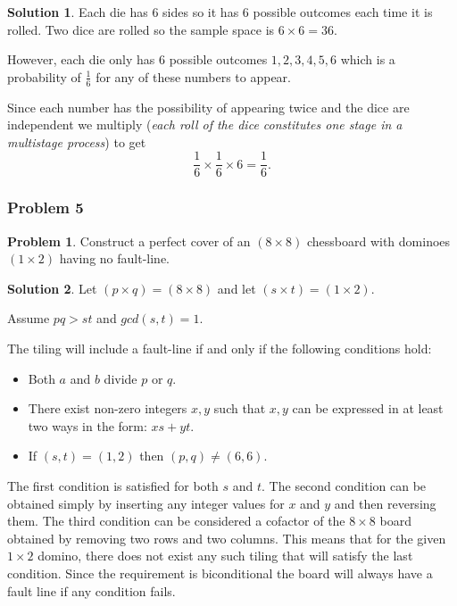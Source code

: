 \documentclass[10pt,a4paper,titlepage,twoside,draft]{article}
\theoremstyle{plain}
\theoremstyle{definition}
\newtheorem*{prob}{Problem}
\newtheorem*{sol}{Solution}
\theoremstyle{remark}
\begin{document}
\medskip

\begin{sol}
    Each die has 6 sides so it has 6 possible outcomes each time it is rolled. Two dice are rolled so the sample space is $6 \times 6 = 36$.

However, each die only has 6 possible outcomes $1, 2, 3, 4, 5, 6$ which is a probability of $\frac{1}{6}$ for any of these numbers to appear. 

Since each number has the possibility of appearing twice and the dice are independent we multiply (\textit{each roll of the dice constitutes one stage in a multistage process}) to get \[ \frac{1}{6} \times \frac{1}{6} \times 6 = \frac{1}{6}.\]
\end{sol} 

\subsubsection{Problem 5} 

\begin{prob}
    Construct a perfect cover of an $(8 \times 8)$ chessboard with dominoes $(1 \times 2)$ having no fault-line.
\end{prob}

\medskip

\begin{sol}
    Let $(p \times q) = (8 \times 8)$ and let $(s \times t) = (1 \times 2)$.

Assume $pq > st$ and $gcd(s,t)=1$.  

The tiling will include a fault-line if and only if the following conditions hold: 
\begin{itemize}
    \item Both $a$ and $b$ divide $p$ or $q$. 
    \item There exist non-zero integers $x,y$ such that $x,y$ can be expressed in at least two ways in the form: $xs+yt$. 
    \item If $(s,t) = (1,2)$ then $(p,q) \neq (6,6)$.
\end{itemize}


The first condition is satisfied for both $s$ and $t$.
The second condition can be obtained simply by inserting any integer values for $x$ and $y$ and then reversing them. 
The third condition can be considered a cofactor of the $8 \times 8$ board obtained by removing two rows and two columns. 
This means that for the given $1 \times 2$ domino, there does not exist any such tiling that will satisfy the last condition. Since the requirement is biconditional the board will always have a fault line if any condition fails.  
\end{sol}
\end{document}

